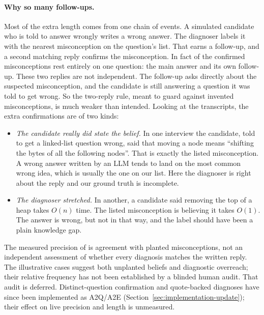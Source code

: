 \documentclass[11pt,a4paper]{article}
\begin{document}
\paragraph{Why so many follow-ups.} Most of the extra length comes from one chain of events. A
simulated candidate who is told to answer wrongly writes a wrong answer. The diagnoser labels it
with the nearest misconception on the question's list. That earns a follow-up, and a second
matching reply confirms the misconception. In fact \confirmedOneQuestion{} of the \confirmedAll{}
confirmed misconceptions rest entirely on one question: the main answer and its own follow-up.
These two replies are not independent. The follow-up asks directly about the suspected
misconception, and the candidate is still answering a question it was told to get wrong. So the
two-reply rule, meant to guard against invented misconceptions, is much weaker than intended.
Looking at the transcripts, the extra confirmations are of two kinds:
\begin{itemize}
  \item \emph{The candidate really did state the belief.} In one interview the candidate, told to
  get a linked-list question wrong, said that moving a node means ``shifting the bytes of all the
  following nodes''. That is exactly the listed misconception. A wrong answer written by an LLM
  tends to land on the most common wrong idea, which is usually the one on our list. Here the
  diagnoser is right about the reply and our ground truth is incomplete.
  \item \emph{The diagnoser stretched.} In another, a candidate said removing the top of a heap
  takes $O(n)$ time. The listed misconception is believing it takes $O(1)$. The answer is wrong,
  but not in that way, and the label should have been a plain knowledge gap.
\end{itemize}
The measured precision of \precisionOurs{} is agreement with planted misconceptions, not an
independent assessment of whether every diagnosis matches the written reply. The illustrative
cases suggest both unplanted beliefs and diagnostic overreach; their relative frequency has not
been established by a blinded human audit. That audit is deferred. Distinct-question confirmation
and quote-backed diagnoses have since been implemented as A2Q/A2E
(Section~\ref{sec:implementation-update}); their effect on live precision and length is unmeasured.
\end{document}

